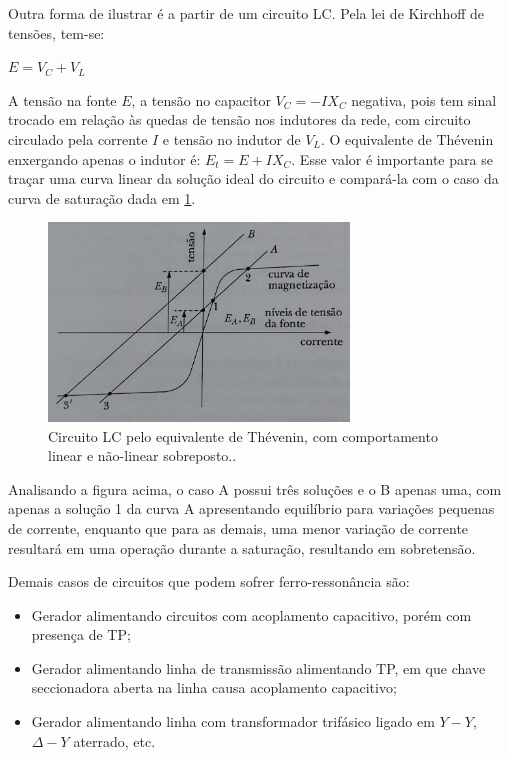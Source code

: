 Outra forma de ilustrar é a partir de um circuito LC. Pela lei de Kirchhoff de tensões, tem-se:

\begin{center}
    $E = V_C + V_L$
\end{center}

A tensão na fonte $E$, a tensão no capacitor $V_C = -I X_C$ negativa, pois tem sinal trocado em relação às quedas de tensão nos indutores da rede, com circuito circulado pela corrente $I$ e tensão no indutor de $V_L$. O equivalente de Thévenin enxergando apenas o indutor é: $E_t = E+IX_C$. Esse valor é importante para se traçar uma curva linear da solução ideal do circuito e compará-la com o caso da curva de saturação dada em \ref{slide5:sat}.

\begin{figure}[H]
\begin{center}
\includegraphics[width=8cm]{images/sat.png}
\caption{Circuito LC pelo equivalente de Thévenin, com comportamento linear e não-linear sobreposto..}
\label{slide5:sat} 
\end{center}
\end{figure}

Analisando a figura acima, o caso A possui três soluções e o B apenas uma, com apenas a solução 1 da curva A apresentando equilíbrio para variações pequenas de corrente, enquanto que para as demais, uma menor variação de corrente resultará em uma operação durante a saturação, resultando em sobretensão.

Demais casos de circuitos que podem sofrer ferro-ressonância são:

\begin{itemize}
    \item Gerador alimentando circuitos com acoplamento capacitivo, porém com presença de TP;
    \item Gerador alimentando linha de transmissão alimentando TP, em que chave seccionadora aberta na linha causa acoplamento capacitivo;
    \item Gerador alimentando linha com transformador trifásico ligado em $Y-Y$, $\Delta-Y$ aterrado, etc.
\end{itemize}

